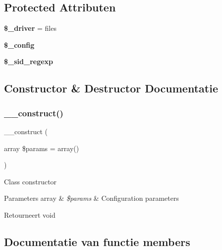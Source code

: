 \subsection*{Protected Attributen}
\begin{DoxyCompactItemize}
\item 
\mbox{\label{class_c_i___session_a538d24348271772aa61f8239cc6431dd}} 
{\bfseries \$\+\_\+driver} = \textquotesingle{}files\textquotesingle{}
\item 
\mbox{\label{class_c_i___session_a4d4ad4af1600438042f93a4492f8dbbe}} 
{\bfseries \$\+\_\+config}
\item 
\mbox{\label{class_c_i___session_a4e2477585e746eb415b2b69bb237be72}} 
{\bfseries \$\+\_\+sid\+\_\+regexp}
\end{DoxyCompactItemize}


\subsection{Constructor \& Destructor Documentatie}
\mbox{\label{class_c_i___session_a85ac5b7f54ad67ec6b5b9dc282717602}} 
\subsubsection{\texorpdfstring{\_\_construct()}{\_\_construct()}}
{\footnotesize\ttfamily \+\_\+\+\_\+construct (\begin{DoxyParamCaption}\item[{array}]{\$params = {\ttfamily array()} }\end{DoxyParamCaption})}

Class constructor


\begin{DoxyParams}[1]{Parameters}
array & {\em \$params} & Configuration parameters \\
\hline
\end{DoxyParams}
\begin{DoxyReturn}{Retourneert}
void 
\end{DoxyReturn}


\subsection{Documentatie van functie members}
\mbox{\label{class_c_i___session_a4537dad3b44254124991341cc91b28fb}} 
